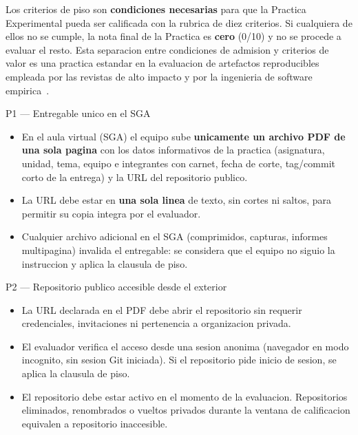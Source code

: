 \documentclass[11pt,a4paper]{article}
\begin{document}
Los criterios de piso son \textbf{condiciones necesarias} para que la Practica Experimental pueda ser calificada con la rubrica de diez criterios. Si cualquiera de ellos no se cumple, la nota final de la Practica es \textbf{cero} (0/10) y no se procede a evaluar el resto. Esta separacion entre condiciones de admision y criterios de valor es una practica estandar en la evaluacion de artefactos reproducibles empleada por las revistas de alto impacto y por la ingenieria de software empirica~\cite{wohlin2012experimentation}.

\begin{cajacritica}{P1 --- Entregable unico en el SGA}
    \begin{itemize}
        \item En el aula virtual (SGA) el equipo sube \textbf{unicamente un archivo PDF de una sola pagina} con los datos informativos de la practica (asignatura, unidad, tema, equipo e integrantes con carnet, fecha de corte, tag/commit corto de la entrega) y la URL del repositorio publico.
        \item La URL debe estar en \textbf{una sola linea} de texto, sin cortes ni saltos, para permitir su copia integra por el evaluador.
        \item Cualquier archivo adicional en el SGA (comprimidos, capturas, informes multipagina) invalida el entregable: se considera que el equipo no siguio la instruccion y aplica la clausula de piso.
    \end{itemize}
\end{cajacritica}

\begin{cajacritica}{P2 --- Repositorio publico accesible desde el exterior}
    \begin{itemize}
        \item La URL declarada en el PDF debe abrir el repositorio sin requerir credenciales, invitaciones ni pertenencia a organizacion privada.
        \item El evaluador verifica el acceso desde una sesion anonima (navegador en modo incognito, sin sesion Git iniciada). Si el repositorio pide inicio de sesion, se aplica la clausula de piso.
        \item El repositorio debe estar activo en el momento de la evaluacion. Repositorios eliminados, renombrados o vueltos privados durante la ventana de calificacion equivalen a repositorio inaccesible.
    \end{itemize}
\end{cajacritica}
\end{document}
